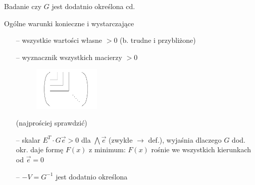   \begin{frame}{Badanie czy $G$ jest dodatnio określona cd.}

    \begin{block}{Ogólne warunki konieczne i wystarczające}
      \begin{itemize}
      		\item[--] wszystkie wartości własne $> 0$ (b. trudne i przybliżone)
      		\item[--] wyznacznik wszystkich macierzy $> 0$
      		\begin{figure}
				\centering
				\includegraphics[height=0.2\textheight ,width=0.3\textwidth]{img/17/matrix}
			\end{figure}
			(najprościej sprawdzić)
			\item[--] skalar $E^T \cdot G\vec{e} > 0$ dla $\bigwedge \vec{e}$ (zwykłe $\rightarrow$ def.), wyjaśnia dlaczego $G$ dod.
			okr. daje formę $F(x)$ z minimum: $F(x)$ rośnie we wszystkich kierunkach od $\vec{e} = 0$
			\item[--] $-V = G^{-1}$ jest dodatnio określona
      \end{itemize}
    \end{block}

  \end{frame}

